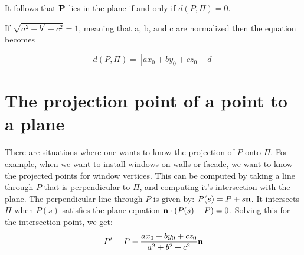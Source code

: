It follows that $\bold P$ lies in the plane if and only if $d(P, \Pi)=0$.

If $\sqrt{a^2+b^2+c^2}=1$, meaning that a, b, and c are normalized then the equation becomes

\begin{equation*}
d(P, \Pi) = \ | a x_0 + b y_0 + c z_0+d |
\end{equation*}


\section{The projection point of a point to a plane}
There are situations where one wants to know the projection of $P$ onto $\Pi$. 
For example, when we want to install windows on walls or facade, we want to
know the projected points for window vertices.
This can be computed by taking a line through $P$ 
that is perpendicular to $\Pi$, and computing it's intersection with the plane.  
The perpendicular line through $P$ is given by:
$ P(s) = P + s\bold n$.  
It intersects $\Pi$ when $P(s)$ satisfies the plane equation 
$\bold n \cdot (P(s)-P) = 0$.  
Solving this for the intersection point, we get:
\begin{equation}
\label{eq:proj_pt}
P' = P - \frac{ax_0 + by_0 + cz_0}{a^2 + b^2 + c^2}\bold n
\end{equation}

